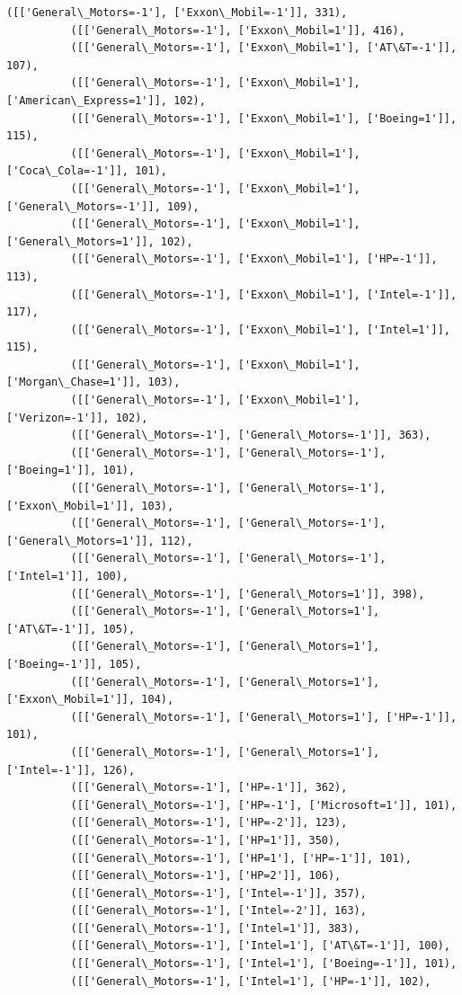 \documentclass[11pt]{article}
\begin{document}
\begin{Verbatim}[commandchars=\\\{\}]
          ([['General\_Motors=-1'], ['Exxon\_Mobil=-1']], 331),
          ([['General\_Motors=-1'], ['Exxon\_Mobil=1']], 416),
          ([['General\_Motors=-1'], ['Exxon\_Mobil=1'], ['AT\&T=-1']], 107),
          ([['General\_Motors=-1'], ['Exxon\_Mobil=1'], ['American\_Express=1']], 102),
          ([['General\_Motors=-1'], ['Exxon\_Mobil=1'], ['Boeing=1']], 115),
          ([['General\_Motors=-1'], ['Exxon\_Mobil=1'], ['Coca\_Cola=-1']], 101),
          ([['General\_Motors=-1'], ['Exxon\_Mobil=1'], ['General\_Motors=-1']], 109),
          ([['General\_Motors=-1'], ['Exxon\_Mobil=1'], ['General\_Motors=1']], 102),
          ([['General\_Motors=-1'], ['Exxon\_Mobil=1'], ['HP=-1']], 113),
          ([['General\_Motors=-1'], ['Exxon\_Mobil=1'], ['Intel=-1']], 117),
          ([['General\_Motors=-1'], ['Exxon\_Mobil=1'], ['Intel=1']], 115),
          ([['General\_Motors=-1'], ['Exxon\_Mobil=1'], ['Morgan\_Chase=1']], 103),
          ([['General\_Motors=-1'], ['Exxon\_Mobil=1'], ['Verizon=-1']], 102),
          ([['General\_Motors=-1'], ['General\_Motors=-1']], 363),
          ([['General\_Motors=-1'], ['General\_Motors=-1'], ['Boeing=1']], 101),
          ([['General\_Motors=-1'], ['General\_Motors=-1'], ['Exxon\_Mobil=1']], 103),
          ([['General\_Motors=-1'], ['General\_Motors=-1'], ['General\_Motors=1']], 112),
          ([['General\_Motors=-1'], ['General\_Motors=-1'], ['Intel=1']], 100),
          ([['General\_Motors=-1'], ['General\_Motors=1']], 398),
          ([['General\_Motors=-1'], ['General\_Motors=1'], ['AT\&T=-1']], 105),
          ([['General\_Motors=-1'], ['General\_Motors=1'], ['Boeing=-1']], 105),
          ([['General\_Motors=-1'], ['General\_Motors=1'], ['Exxon\_Mobil=1']], 104),
          ([['General\_Motors=-1'], ['General\_Motors=1'], ['HP=-1']], 101),
          ([['General\_Motors=-1'], ['General\_Motors=1'], ['Intel=-1']], 126),
          ([['General\_Motors=-1'], ['HP=-1']], 362),
          ([['General\_Motors=-1'], ['HP=-1'], ['Microsoft=1']], 101),
          ([['General\_Motors=-1'], ['HP=-2']], 123),
          ([['General\_Motors=-1'], ['HP=1']], 350),
          ([['General\_Motors=-1'], ['HP=1'], ['HP=-1']], 101),
          ([['General\_Motors=-1'], ['HP=2']], 106),
          ([['General\_Motors=-1'], ['Intel=-1']], 357),
          ([['General\_Motors=-1'], ['Intel=-2']], 163),
          ([['General\_Motors=-1'], ['Intel=1']], 383),
          ([['General\_Motors=-1'], ['Intel=1'], ['AT\&T=-1']], 100),
          ([['General\_Motors=-1'], ['Intel=1'], ['Boeing=-1']], 101),
          ([['General\_Motors=-1'], ['Intel=1'], ['HP=-1']], 102),

\end{Verbatim}
\end{document}
